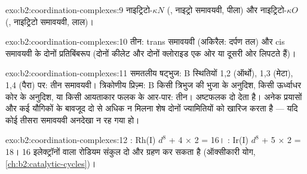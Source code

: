 \begin{solution}{exo:b2:coordination-complexes:9}
नाइट्रिटो-$\kappa N$ (, नाइट्रो समावयवी, पीला) और नाइट्रिटो-$\kappa O$
(, नाइट्रिटो समावयवी, लाल)।
\end{solution}

\begin{solution}{exo:b2:coordination-complexes:10}
तीन: trans समावयवी (अकिरैल: दर्पण तल) और cis
समावयवी के दोनों प्रतिबिंबरूप (दोनों कीलेट और दोनों क्लोराइड एक ओर या दूसरी ओर लिपटते हैं)।
\end{solution}

\begin{solution}{exo:b2:coordination-complexes:11}
समतलीय षट्भुज: B स्थितियों 1,2 (ऑर्थो), 1,3 (मेटा), 1,4 (पैरा) पर: तीन समावयवी।
त्रिकोणीय प्रिज़्म: B किसी त्रिभुज की भुजा के अनुदिश, किसी ऊर्ध्वाधर कोर के अनुदिश, या किसी
आयताकार फलक के आर-पार: तीन। अष्टफलक दो देता है। अनेक प्रयासों और कई यौगिकों के बावजूद
दो से अधिक न मिलना शेष दोनों ज्यामितियों को खारिज करता है --- यदि कोई
तीसरा समावयवी अनदेखा न रह गया हो।
\end{solution}

\begin{solution}{exo:b2:coordination-complexes:12}
: Rh(I) $d^8$ + 4 × 2 = 16। : Ir(I) $d^8$ + 5 × 2 =
18। 16 इलेक्ट्रॉनों वाला रोडियम संकुल दो और ग्रहण कर सकता है (ऑक्सीकारी योग,
\cref{ch:b2:catalytic-cycles})।
\end{solution}

